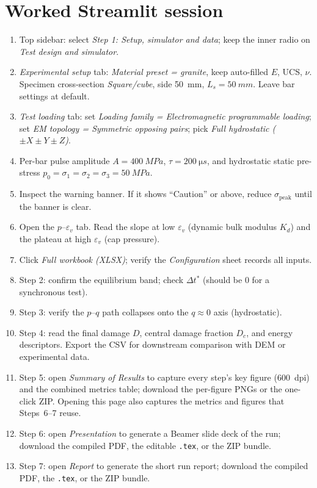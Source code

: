 \documentclass[11pt,a4paper,openany]{book}
\providecommand{\SI}[2]{\qty{#1}{#2}}
\theoremstyle{handbook}
\newcommand{\sig}{\sigma}
\newcommand{\eps}{\varepsilon}
\newcommand{\Ls}{L_s}
\newcommand{\sigpeak}{\sig_{\text{peak}}}
\begin{document}
\section{Worked Streamlit session}

\begin{stepbox}
\begin{enumerate}[leftmargin=*,itemsep=3pt]
  \item Top sidebar: select \emph{Step 1: Setup, simulator and data}; keep
        the inner radio on \emph{Test design and simulator}.
  \item \emph{Experimental setup} tab: \emph{Material preset = granite},
        keep auto-filled $E$, UCS, $\nu$. Specimen cross-section
        \emph{Square/cube}, side \SI{50}{mm}, $\Ls=\SI{50}{mm}$. Leave bar
        settings at default.
  \item \emph{Test loading} tab: set \emph{Loading family =
        Electromagnetic programmable loading}; set \emph{EM topology =
        Symmetric opposing pairs}; pick \emph{Full hydrostatic
        ($\pm X\pm Y\pm Z$)}.
  \item Per-bar pulse amplitude $A=\SI{400}{MPa}$,
        $\tau=\SI{200}{\micro s}$, and hydrostatic static pre-stress
        $p_0=\sig_1=\sig_2=\sig_3=\SI{50}{MPa}$.
  \item Inspect the warning banner. If it shows ``Caution'' or above,
        reduce $\sigpeak$ until the banner is clear.
  \item Open the $p$--$\eps_v$ tab. Read the slope at low $\eps_v$ (dynamic
        bulk modulus $K_d$) and the plateau at high $\eps_v$ (cap
        pressure).
  \item Click \emph{Full workbook (XLSX)}; verify the
        \emph{Configuration} sheet records all inputs.
  \item Step 2: confirm the equilibrium band; check $\Delta t^{\ast}$
        (should be 0 for a synchronous test).
  \item Step 3: verify the $p$--$q$ path collapses onto the $q\approx 0$
        axis (hydrostatic).
  \item Step 4: read the final damage $D$, central damage fraction $D_c$,
        and energy descriptors. Export the CSV for downstream comparison
        with DEM or experimental data.
  \item Step 5: open \emph{Summary of Results} to capture every step's key
        figure (\SI{600}{dpi}) and the combined metrics table; download the
        per-figure PNGs or the one-click ZIP. Opening this page also captures
        the metrics and figures that Steps~6--7 reuse.
  \item Step 6: open \emph{Presentation} to generate a Beamer slide deck of
        the run; download the compiled PDF, the editable \texttt{.tex}, or the
        ZIP bundle.
  \item Step 7: open \emph{Report} to generate the short run report; download
        the compiled PDF, the \texttt{.tex}, or the ZIP bundle.
\end{enumerate}
\end{stepbox}
\end{document}
